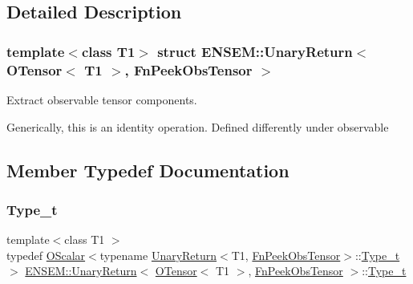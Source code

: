 \subsection{Detailed Description}
\subsubsection*{template$<$class T1$>$\newline
struct E\+N\+S\+E\+M\+::\+Unary\+Return$<$ O\+Tensor$<$ T1 $>$, Fn\+Peek\+Obs\+Tensor $>$}

Extract observable tensor components. 

Generically, this is an identity operation. Defined differently under observable 

\subsection{Member Typedef Documentation}
\mbox{\label{structENSEM_1_1UnaryReturn_3_01OTensor_3_01T1_01_4_00_01FnPeekObsTensor_01_4_abefeb4103abe844c4b6cbc2df22fd844}} 
\subsubsection{\texorpdfstring{Type\_t}{Type\_t}\hspace{0.1cm}{\footnotesize\ttfamily [1/3]}}
{\footnotesize\ttfamily template$<$class T1 $>$ \\
typedef \mbox{\hyperlink{classENSEM_1_1OScalar}{O\+Scalar}}$<$typename \mbox{\hyperlink{structENSEM_1_1UnaryReturn}{Unary\+Return}}$<$T1, \mbox{\hyperlink{structENSEM_1_1FnPeekObsTensor}{Fn\+Peek\+Obs\+Tensor}}$>$\+::\mbox{\hyperlink{structENSEM_1_1UnaryReturn_3_01OTensor_3_01T1_01_4_00_01FnPeekObsTensor_01_4_abefeb4103abe844c4b6cbc2df22fd844}{Type\+\_\+t}}$>$ \mbox{\hyperlink{structENSEM_1_1UnaryReturn}{E\+N\+S\+E\+M\+::\+Unary\+Return}}$<$ \mbox{\hyperlink{classENSEM_1_1OTensor}{O\+Tensor}}$<$ T1 $>$, \mbox{\hyperlink{structENSEM_1_1FnPeekObsTensor}{Fn\+Peek\+Obs\+Tensor}} $>$\+::\mbox{\hyperlink{structENSEM_1_1UnaryReturn_3_01OTensor_3_01T1_01_4_00_01FnPeekObsTensor_01_4_abefeb4103abe844c4b6cbc2df22fd844}{Type\+\_\+t}}}


